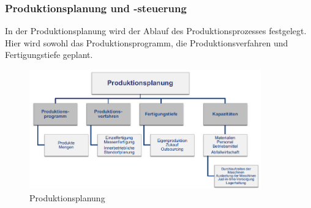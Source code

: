 \documentclass[a4paper,12pt, german]{report}
\begin{document}


\subsubsection{Produktionsplanung und -steuerung}

In der Produktionsplanung wird der Ablauf des Produktionsprozesses festgelegt. Hier wird sowohl das Produktionsprogramm, die Produktionsverfahren und Fertigungstiefe geplant.

\begin{figure}[H]
  \center
 \includegraphics[width=10cm]{images/Produktionsplanung.png}
  \caption[Produktionsplanung]{Produktionsplanung \cite{07}}
\end{figure}
\end{document}
